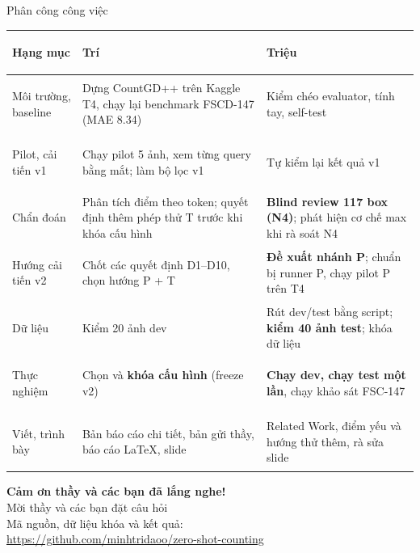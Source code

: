\documentclass[aspectratio=169,10pt]{beamer}
\begin{document}
\begin{frame}{Phân công công việc}
\scriptsize\centering
\renewcommand{\arraystretch}{1.2}
\begin{tabularx}{\textwidth}{@{}>{\bfseries\raggedright\arraybackslash}p{} >{\raggedright\arraybackslash}X >{\raggedright\arraybackslash}X@{}}
\toprule
\normalfont\bfseries Hạng mục & \textbf{Trí} & \textbf{Triệu}\\
\midrule
Môi trường, baseline & Dựng CountGD++ trên Kaggle T4, chạy lại benchmark FSCD-147 (MAE 8.34) & Kiểm chéo evaluator, tính tay, self-test\\
Pilot, cải tiến v1 & Chạy pilot 5 ảnh, xem từng query bằng mắt; làm bộ lọc v1 & Tự kiểm lại kết quả v1\\
Chẩn đoán & Phân tích điểm theo token; quyết định thêm phép thử T trước khi khóa cấu hình & \textbf{Blind review 117 box (N4)}; phát hiện cơ chế max khi rà soát N4\\
Hướng cải tiến v2 & Chốt các quyết định D1--D10, chọn hướng P + T & \textbf{Đề xuất nhánh P}; chuẩn bị runner P, chạy pilot P trên T4\\
Dữ liệu & Kiểm 20 ảnh dev & Rút dev/test bằng script; \textbf{kiểm 40 ảnh test}; khóa dữ liệu\\
Thực nghiệm & Chọn và \textbf{khóa cấu hình} (freeze v2) & \textbf{Chạy dev, chạy test một lần}, chạy khảo sát FSC-147\\
Viết, trình bày & Bản báo cáo chi tiết, bản gửi thầy, báo cáo LaTeX, slide & Related Work, điểm yếu và hướng thử thêm, rà sửa slide\\
\bottomrule
\end{tabularx}
\end{frame}

\begin{frame}[c]
\centering
{\Large\bfseries\color{accent!80!black} Cảm ơn thầy và các bạn đã lắng nghe!}\\[3mm]
{\large Mời thầy và các bạn đặt câu hỏi}\\[6mm]
{\normalsize Mã nguồn, dữ liệu khóa và kết quả:}\\
{\small\url{https://github.com/minhtridaoo/zero-shot-counting}}
\end{frame}
\end{document}

